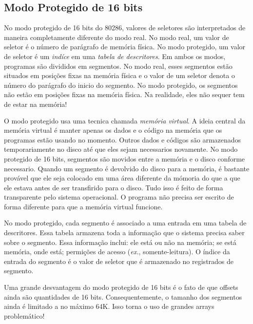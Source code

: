 \subsection{Modo Protegido de 16 bits \label{16prot_mode} }

No modo protegido de 16 bits do 80286, valores de seletores são interpretados
de maneira completamente diferente do modo real. No modo real, um valor de
seletor é o número de parágrafo de memória física. No modo protegido, um valor
de seletor é um \emph{indíce} em uma \emph{tabela de descritores}. Em ambos os 
modos, programas são divididos em segmentos. No modo
real, esses segmentos estão situados em posições fixas na memória física e o
valor de um seletor denota o número do parágrafo do inicio do segmento. No modo
protegido, os segmentos não estão em posições fixas na memória física. Na
realidade, eles não sequer tem de estar na memória!

O modo protegido usa uma tecnica chamada \emph{memória
virtual}. A ideia central da memória virtual é manter
apenas os dados e o código na memória que os programas estão usando no momento.
Outros dados e códigos são armazenados temporariamente no disco até que eles
sejam necessarios novamente. No modo protegido de 16 bits, segmentos são
movidos entre a memória e o disco conforme necessario. Quando um segmento é
devolvido do disco para a memória, é bastante provável que ele seja colocado em
uma área diferente da mómoria do que a que ele estava antes de ser transfirido
para o disco. Tudo isso é feito de forma transparente pelo sistema operacional.
O programa não precisa ser escrito de forma diferente para que a memória
virtual funcione.

No modo protegido, cada segmento é associado a uma entrada em uma tabela de
descritores. Essa tabela armazena toda a informação que o sistema precisa saber
sobre o segmento. Essa informação inclui: ele está ou não na memória; se está
memória, onde está; permições de acesso ({\em ex.\/}, somente-leitura). O
índice da entrada do segmento é o valor de seletor que é armazenado no
registrados de segmento.

Uma 
grande desvantagem do modo protegido de 16 bits é o fato de que offsets ainda
são quantidades de 16 bits. Consequentemente, o tamanho dos segmentos ainda é
limitado a no máximo 64K. Isso torna o uso de grandes arrays problemático!

